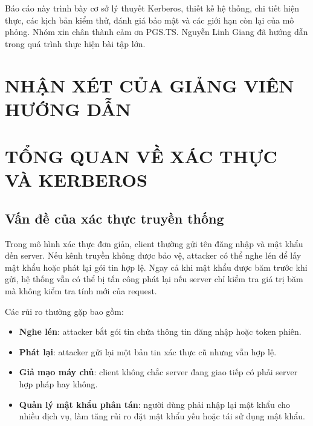 \documentclass[12pt]{article}
\begin{document}
Báo cáo này trình bày cơ sở lý thuyết Kerberos, thiết kế hệ thống, chi tiết hiện thực, các kịch bản kiểm thử, đánh giá bảo mật và các giới hạn còn lại của mô phỏng. Nhóm xin chân thành cảm ơn PGS.TS. Nguyễn Linh Giang đã hướng dẫn trong quá trình thực hiện bài tập lớn.

\newpage
\section*{NHẬN XÉT CỦA GIẢNG VIÊN HƯỚNG DẪN}
\vspace{0.5cm}
\noindent\dotfill

\vspace{0.8cm}
\noindent\dotfill

\vspace{0.8cm}
\noindent\dotfill

\vspace{0.8cm}
\noindent\dotfill

\vspace{0.8cm}
\noindent\dotfill

\vspace{0.8cm}
\noindent\dotfill

\vspace{0.8cm}
\noindent\dotfill

\vspace{0.8cm}
\noindent\dotfill

\newpage
\tableofcontents
\newpage

\section{TỔNG QUAN VỀ XÁC THỰC VÀ KERBEROS}

\subsection{Vấn đề của xác thực truyền thống}

Trong mô hình xác thực đơn giản, client thường gửi tên đăng nhập và mật khẩu đến server. Nếu kênh truyền không được bảo vệ, attacker có thể nghe lén để lấy mật khẩu hoặc phát lại gói tin hợp lệ. Ngay cả khi mật khẩu được băm trước khi gửi, hệ thống vẫn có thể bị tấn công phát lại nếu server chỉ kiểm tra giá trị băm mà không kiểm tra tính mới của request.

Các rủi ro thường gặp bao gồm:
\begin{itemize}
    \item \textbf{Nghe lén}: attacker bắt gói tin chứa thông tin đăng nhập hoặc token phiên.
    \item \textbf{Phát lại}: attacker gửi lại một bản tin xác thực cũ nhưng vẫn hợp lệ.
    \item \textbf{Giả mạo máy chủ}: client không chắc server đang giao tiếp có phải server hợp pháp hay không.
    \item \textbf{Quản lý mật khẩu phân tán}: người dùng phải nhập lại mật khẩu cho nhiều dịch vụ, làm tăng rủi ro đặt mật khẩu yếu hoặc tái sử dụng mật khẩu.
\end{itemize}
\end{document}
